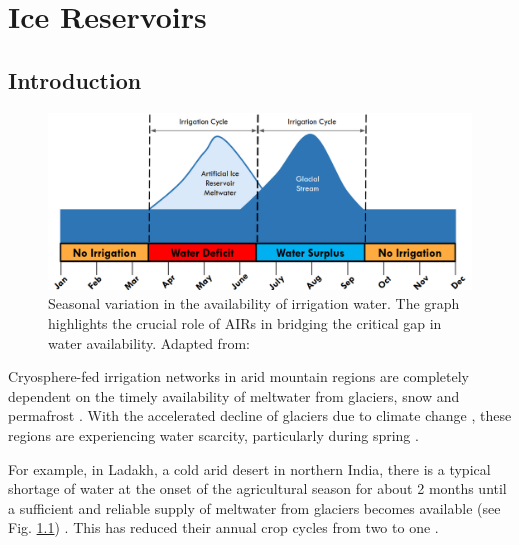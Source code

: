 \chapter{Ice Reservoirs}

\section{Introduction}

\begin{figure}[t]
\centering
\includegraphics[width=12cm]{figs/irrigation_cycles.png}

\caption{Seasonal variation in the availability of irrigation water. The graph highlights the crucial role of
AIRs in bridging the critical gap in water availability. Adapted from: \cite{nusserLocalKnowledgeGlobal2016}}

\label{fig:irrigation_cycles}
\end{figure}

Cryosphere-fed irrigation networks in arid mountain regions are completely dependent on the timely availability
of meltwater from glaciers, snow and permafrost \citep{immerzeelImportanceVulnerabilityWorld2020,
farhanHydrologicalRegimesConjunction2015, tveitenGlacierGrowingLocal2007}. With the accelerated decline of
glaciers due to climate change \citep{nusserLocalKnowledgeGlobal2016}, these regions are experiencing water
scarcity, particularly during spring \citep{norphelSnowWaterHarvesting2015,
mukhopadhyayReevaluationSnowmeltGlacial2015}.

For example, in Ladakh, a cold arid desert in northern India, there is a typical shortage of water at the onset
of the agricultural season for about 2 months until a sufficient and reliable supply of meltwater from glaciers
becomes available (see Fig. \ref{fig:irrigation_cycles}) \citep{norphelSnowWaterHarvesting2015,
nusserLocalKnowledgeGlobal2016, vincentEnergyClimateChange2009}. This has reduced their annual crop cycles from
two to one \citep{nusserSociohydrologyArtificialGlaciers2019}.

